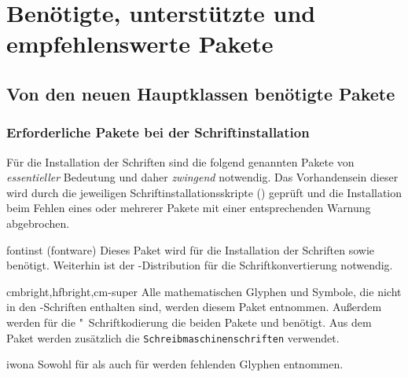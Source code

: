 \chapter{Benötigte, unterstützte und empfehlenswerte Pakete}
%
\section{Von den neuen Hauptklassen benötigte Pakete}
\label{sec:packages:needed}
\subsection{Erforderliche Pakete bei der Schriftinstallation}
%
Für die Installation der Schriften sind die folgend genannten Pakete von
\emph{essentieller} Bedeutung und daher \emph{zwingend} notwendig. Das 
Vorhandensein dieser wird durch die jeweiligen Schriftinstallationsskripte
() geprüft und die Installation beim Fehlen eines 
oder mehrerer Pakete mit einer entsprechenden Warnung abgebrochen.
%
\begin{packages}
\item[fontinst](fontware)
  Dieses Paket wird für die Installation der Schriften \Univers sowie \DIN 
  benötigt. Weiterhin ist  der -Distribution 
  für die Schriftkonvertierung notwendig.
\item[cmbright,hfbright,cm-super]
  Alle mathematischen Glyphen und Symbole, die nicht in den \Univers-Schriften 
  enthalten sind, werden diesem Paket entnommen. Außerdem werden für die 
  "~Schriftkodierung die beiden Pakete  und 
   benötigt. Aus dem Paket  werden 
  zusätzlich die \texttt{Schreibmaschinenschriften} verwendet.
\item[iwona]
  Sowohl für \Univers als auch für \DIN werden fehlenden Glyphen entnommen.
\end{packages}



